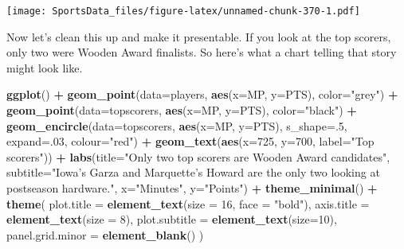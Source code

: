 \documentclass[
]{book}
\newenvironment{Shaded}{\begin{snugshade}}{\end{snugshade}}
\newcommand{\DataTypeTok}[1]{\textcolor[rgb]{0.13,0.29,0.53}{#1}}
\newcommand{\DecValTok}[1]{\textcolor[rgb]{0.00,0.00,0.81}{#1}}
\newcommand{\KeywordTok}[1]{\textcolor[rgb]{0.13,0.29,0.53}{\textbf{#1}}}
\newcommand{\NormalTok}[1]{#1}
\newcommand{\OperatorTok}[1]{\textcolor[rgb]{0.81,0.36,0.00}{\textbf{#1}}}
\newcommand{\StringTok}[1]{\textcolor[rgb]{0.31,0.60,0.02}{#1}}
\begin{document}
\texttt{[image: SportsData\_files/figure-latex/unnamed-chunk-370-1.pdf]}

Now let's clean this up and make it presentable. If you look at the top scorers, only two were Wooden Award finalists. So here's what a chart telling that story might look like.

\begin{Shaded}
\begin{Highlighting}[]
\KeywordTok{ggplot}\NormalTok{() }\OperatorTok{+}\StringTok{ }
\StringTok{  }\KeywordTok{geom_point}\NormalTok{(}\DataTypeTok{data=}\NormalTok{players, }\KeywordTok{aes}\NormalTok{(}\DataTypeTok{x=}\NormalTok{MP, }\DataTypeTok{y=}\NormalTok{PTS), }\DataTypeTok{color=}\StringTok{"grey"}\NormalTok{) }\OperatorTok{+}\StringTok{ }
\StringTok{  }\KeywordTok{geom_point}\NormalTok{(}\DataTypeTok{data=}\NormalTok{topscorers, }\KeywordTok{aes}\NormalTok{(}\DataTypeTok{x=}\NormalTok{MP, }\DataTypeTok{y=}\NormalTok{PTS), }\DataTypeTok{color=}\StringTok{"black"}\NormalTok{) }\OperatorTok{+}\StringTok{ }
\StringTok{  }\KeywordTok{geom_encircle}\NormalTok{(}\DataTypeTok{data=}\NormalTok{topscorers, }\KeywordTok{aes}\NormalTok{(}\DataTypeTok{x=}\NormalTok{MP, }\DataTypeTok{y=}\NormalTok{PTS), }\DataTypeTok{s_shape=}\NormalTok{.}\DecValTok{5}\NormalTok{, }\DataTypeTok{expand=}\NormalTok{.}\DecValTok{03}\NormalTok{, }\DataTypeTok{colour=}\StringTok{"red"}\NormalTok{) }\OperatorTok{+}
\StringTok{  }\KeywordTok{geom_text}\NormalTok{(}\KeywordTok{aes}\NormalTok{(}\DataTypeTok{x=}\DecValTok{725}\NormalTok{, }\DataTypeTok{y=}\DecValTok{700}\NormalTok{, }\DataTypeTok{label=}\StringTok{"Top scorers"}\NormalTok{)) }\OperatorTok{+}\StringTok{ }
\StringTok{  }\KeywordTok{labs}\NormalTok{(}\DataTypeTok{title=}\StringTok{"Only two top scorers are Wooden Award candidates"}\NormalTok{, }\DataTypeTok{subtitle=}\StringTok{"Iowa's Garza and Marquette's Howard are the only two looking at postseason hardware."}\NormalTok{, }\DataTypeTok{x=}\StringTok{"Minutes"}\NormalTok{, }\DataTypeTok{y=}\StringTok{"Points"}\NormalTok{) }\OperatorTok{+}\StringTok{ }
\StringTok{  }\KeywordTok{theme_minimal}\NormalTok{() }\OperatorTok{+}\StringTok{ }
\StringTok{  }\KeywordTok{theme}\NormalTok{(}
    \DataTypeTok{plot.title =} \KeywordTok{element_text}\NormalTok{(}\DataTypeTok{size =} \DecValTok{16}\NormalTok{, }\DataTypeTok{face =} \StringTok{"bold"}\NormalTok{),}
    \DataTypeTok{axis.title =} \KeywordTok{element_text}\NormalTok{(}\DataTypeTok{size =} \DecValTok{8}\NormalTok{), }
    \DataTypeTok{plot.subtitle =} \KeywordTok{element_text}\NormalTok{(}\DataTypeTok{size=}\DecValTok{10}\NormalTok{), }
    \DataTypeTok{panel.grid.minor =} \KeywordTok{element_blank}\NormalTok{()}
\NormalTok{    )}
\end{Highlighting}
\end{Shaded}
\end{document}

